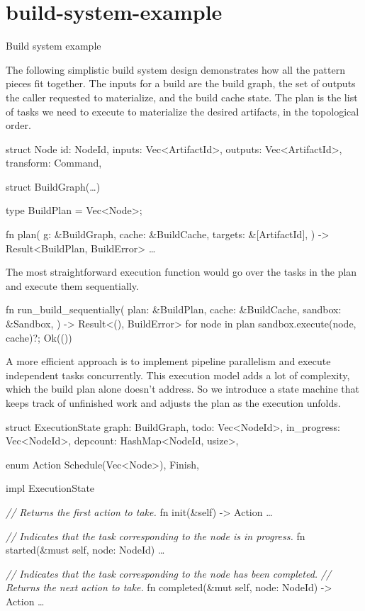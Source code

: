 \documentclass{article}
\begin{document}
\section{build-system-example}{Build system example}

The following simplistic build system design demonstrates how all the pattern pieces fit together.
The inputs for a build are the build graph, the set of outputs the caller requested to materialize, and the build cache state.
The plan is the list of tasks we need to execute to materialize the desired artifacts, in the topological order.

\begin{code}[rust]
struct Node {
    id: NodeId,
    inputs: Vec<ArtifactId>,
    outputs: Vec<ArtifactId>,
    transform: Command,
}

struct BuildGraph(\ldots)

type BuildPlan = Vec<Node>;

fn plan(
    g: &BuildGraph,
    cache: &BuildCache,
    targets: &[ArtifactId],
) -> Result<BuildPlan, BuildError> { \ldots  }
\end{code}

The most straightforward execution function would go over the tasks in the plan and execute them sequentially.

\begin{code}[rust]
fn run_build_sequentially(
    plan: &BuildPlan,
    cache: &BuildCache,
    sandbox: &Sandbox,
) -> Result<(), BuildError> {
    for node in plan {
        sandbox.execute(node, cache)?;
    }
    Ok(())
}
\end{code}

A more efficient approach is to implement pipeline parallelism and execute independent tasks concurrently.
This execution model adds a lot of complexity, which the build plan alone doesn't address.
So we introduce a state machine that keeps track of unfinished work and adjusts the plan as the execution unfolds.

\begin{code}[rust]
struct ExecutionState {
    graph: BuildGraph,
    todo: Vec<NodeId>,
    in_progress: Vec<NodeId>,
    depcount: HashMap<NodeId, usize>,
}

enum Action {
    Schedule(Vec<Node>),
    Finish,
}

impl ExecutionState {
    \emph{// Returns the first action to take.}
    fn init(&self) -> Action { \ldots  }

    \emph{// Indicates that the task corresponding to the node is in progress.}
    fn started(&must self, node: NodeId) { \ldots  }

    \emph{// Indicates that the task corresponding to the node has been completed.}
    \emph{// Returns the next action to take.}
    fn completed(&mut self, node: NodeId) -> Action { \ldots  }
}
\end{code}
\end{document}
